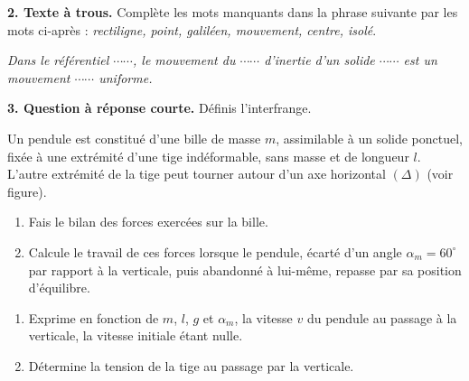 \documentclass[11pt]{article}
\begin{document}
\medskip
\noindent\textbf{2. Texte à trous.} Complète les mots manquants dans la phrase suivante par les mots ci-après : \textit{rectiligne, point, galiléen, mouvement, centre, isolé}.

\textit{Dans le référentiel $\cdots\cdots$, le mouvement du $\cdots\cdots$ d'inertie d'un solide $\cdots\cdots$ est un mouvement $\cdots\cdots$ uniforme.}

\medskip
\noindent\textbf{3. Question à réponse courte.} Définis l'interfrange.


\begin{minipage}{0.6\linewidth}
Un pendule est constitué d'une bille de masse $m$, assimilable à un solide ponctuel, fixée à une extrémité d'une tige indéformable, sans masse et de longueur $l$. L'autre extrémité de la tige peut tourner autour d'un axe horizontal $(\Delta)$ (voir figure).

\begin{enumerate}
  \item Fais le bilan des forces exercées sur la bille.
  \item Calcule le travail de ces forces lorsque le pendule, écarté d'un angle $\alpha_m = 60^\circ$ par rapport à la verticale, puis abandonné à lui-même, repasse par sa position d'équilibre.
\end{enumerate}
\end{minipage}\hfill
\begin{minipage}{0.36\linewidth}
\centering
{}
\end{minipage}

\begin{enumerate}[start=3]
  \item Exprime en fonction de $m$, $l$, $g$ et $\alpha_m$, la vitesse $v$ du pendule au passage à la verticale, la vitesse initiale étant nulle.
  \item Détermine la tension de la tige au passage par la verticale.
\end{enumerate}
\end{document}
